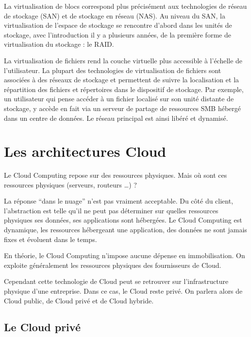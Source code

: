 \documentclass[a4paper,12pt]{report}
\begin{document}
\begin{onehalfspace}
	La virtualisation de blocs correspond plus précisément aux technologies de réseau de stockage 
(SAN) et de stockage en réseau (NAS). Au niveau du SAN, la virtualisation de l'espace de stockage se rencontre d'abord dans les unités de stockage, avec l'introduction il y a plusieurs années, de la première forme de virtualisation du stockage : le RAID.
 
	La virtualisation de fichiers rend la couche virtuelle plus accessible à l'échelle de l'utilisateur. La plupart des technologies de virtualisation de fichiers sont associées à des réseaux de stockage et permettent de suivre la localisation et la répartition des fichiers et répertoires dans 
le dispositif de stockage. Par exemple, un utilisateur qui pense accéder à un fichier localisé sur 
son unité distante de stockage, y accède en fait via un serveur de partage de ressources SMB hébergé dans un centre de données. Le réseau principal est ainsi libéré et dynamisé.  
	
	\section{Les architectures Cloud}

	\paragraph*{}
	Le Cloud Computing repose sur des ressources physiques. Mais où sont ces ressources physiques (serveurs, routeurs …) ?
	
	La réponse “dans le nuage” n’est pas vraiment acceptable. Du côté du client, l’abstraction est telle qu’il ne peut pas déterminer sur quelles ressources physiques ses données, ses applications sont hébergées. Le Cloud Computing est dynamique, les ressources hébergeant une application, des données ne sont jamais fixes et évoluent dans le temps.
	
En théorie, le Cloud Computing n’impose aucune dépense en immobilisation. On exploite généralement les ressources physiques des fournisseurs de Cloud.

	Cependant cette technologie de Cloud peut se retrouver sur l’infrastructure physique d’une entreprise. Dans ce cas, le Cloud reste privé. On parlera alors de Cloud public, de Cloud privé et de Cloud hybride.
	
	\subsection{Le Cloud privé}
	

\end{onehalfspace}
\end{document}
